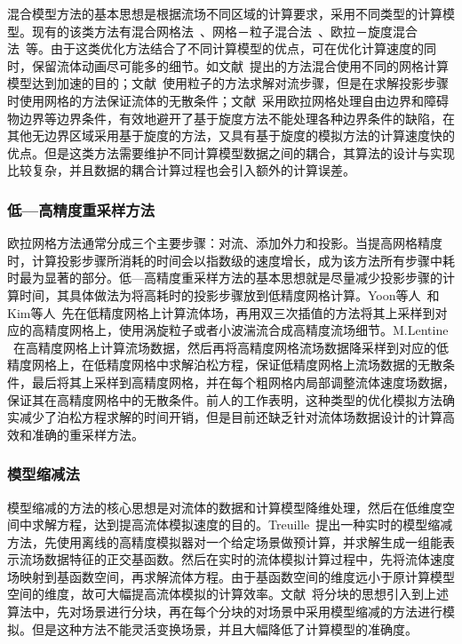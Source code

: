 混合模型方法的基本思想是根据流场不同区域的计算要求，采用不同类型的计算模型。现有的该类方法有混合网格法~\cite{dobashi2008fast}、网格－粒子混合法~\cite{zhu2010creating}、欧拉－旋度混合法~\cite{golas2012large}等。由于这类优化方法结合了不同计算模型的优点，可在优化计算速度的同时，保留流体动画尽可能多的细节。如文献~\cite{dobashi2008fast}提出的方法混合使用不同的网格计算模型达到加速的目的；文献~\cite{zhu2010creating}使用粒子的方法求解对流步骤，但是在求解投影步骤时使用网格的方法保证流体的无散条件；文献~\cite{golas2012large}采用欧拉网格处理自由边界和障碍物边界等边界条件，有效地避开了基于旋度方法不能处理各种边界条件的缺陷，在其他无边界区域采用基于旋度的方法，又具有基于旋度的模拟方法的计算速度快的优点。但是这类方法需要维护不同计算模型数据之间的耦合，其算法的设计与实现比较复杂，并且数据的耦合计算过程也会引入额外的计算误差。

\subsubsection{低—高精度重采样方法}
\label{sec:low-high-resampling}

欧拉网格方法通常分成三个主要步骤：对流、添加外力和投影。当提高网格精度时，计算投影步骤所消耗的时间会以指数级的速度增长，成为该方法所有步骤中耗时最为显著的部分。低—高精度重采样方法的基本思想就是尽量减少投影步骤的计算时间，其具体做法为将高耗时的投影步骤放到低精度网格计算。Yoon等人~\cite{yoon2009procedural}和Kim等人~\cite{kim2008wavelet}先在低精度网格上计算流体场，再用双三次插值的方法将其上采样到对应的高精度网格上，使用涡旋粒子或者小波湍流合成高精度流场细节。M.Lentine ~\cite{lentine2010novel}在高精度网格上计算流场数据，然后再将高精度网格流场数据降采样到对应的低精度网格上，在低精度网格中求解泊松方程，保证低精度网格上流场数据的无散条件，最后将其上采样到高精度网格，并在每个粗网格内局部调整流体速度场数据，保证其在高精度网格中的无散条件。前人的工作表明，这种类型的优化模拟方法确实减少了泊松方程求解的时间开销，但是目前还缺乏针对流体场数据设计的计算高效和准确的重采样方法。

\subsubsection{模型缩减法}
\label{sec:ModelReduction}

模型缩减的方法的核心思想是对流体的数据和计算模型降维处理，然后在低维度空间中求解方程，达到提高流体模拟速度的目的。Treuille~\cite{treuille2006model}提出一种实时的模型缩减方法，先使用离线的高精度模拟器对一个给定场景做预计算，并求解生成一组能表示流场数据特征的正交基函数。然后在实时的流体模拟计算过程中，先将流体速度场映射到基函数空间，再求解流体方程。由于基函数空间的维度远小于原计算模型空间的维度，故可大幅提高流体模拟的计算效率。文献~\cite{wicke2009modular}将分块的思想引入到上述算法中，先对场景进行分块，再在每个分块的对场景中采用模型缩减的方法进行模拟。但是这种方法不能灵活变换场景，并且大幅降低了计算模型的准确度。

